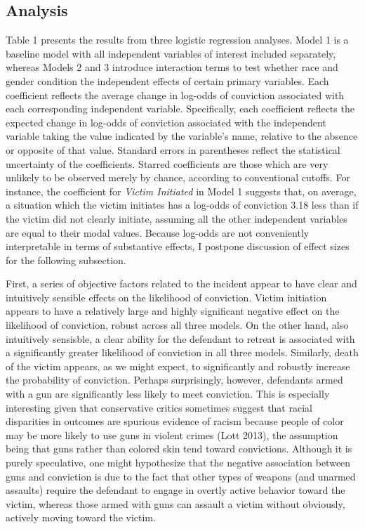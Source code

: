 \documentclass[12pt,article]{article}
\begin{document}
\subsection{Analysis}\label{analysis}

Table 1 presents the results from three logistic regression analyses.
Model 1 is a baseline model with all independent variables of interest
included separately, whereas Models 2 and 3 introduce interaction terms
to test whether race and gender condition the independent effects of
certain primary variables. Each coefficient reflects the average change
in log-odds of conviction associated with each corresponding independent
variable. Specifically, each coefficient reflects the expected change in
log-odds of conviction associated with the independent variable taking
the value indicated by the variable's name, relative to the absence or
opposite of that value. Standard errors in parentheses reflect the
statistical uncertainty of the coefficients. Starred coefficients are
those which are very unlikely to be observed merely by chance, according
to conventional cutoffs. For instance, the coefficient for \emph{Victim
Initiated} in Model 1 suggests that, on average, a situation which the
victim initiates has a log-odds of conviction 3.18 less than if the
victim did not clearly initiate, assuming all the other independent
variables are equal to their modal values. Because log-odds are not
conveniently interpretable in terms of substantive effects, I postpone
discussion of effect sizes for the following subsection.

First, a series of objective factors related to the incident appear to
have clear and intuitively sensible effects on the likelihood of
conviction. Victim initiation appears to have a relatively large and
highly significant negative effect on the likelihood of conviction,
robust across all three models. On the other hand, also intuitively
sensisble, a clear ability for the defendant to retreat is associated
with a significantly greater likelihood of conviction in all three
models. Similarly, death of the victim appears, as we might expect, to
significantly and robustly increase the probability of conviction.
Perhaps surprisingly, however, defendants armed with a gun are
significantly less likely to meet conviction. This is especially
interesting given that conservative critics sometimes suggest that
racial disparities in outcomes are spurious evidence of racism because
people of color may be more likely to use guns in violent crimes (Lott
2013), the assumption being that guns rather than colored skin tend
toward convictions. Although it is purely speculative, one might
hypothesize that the negative association between guns and conviction is
due to the fact that other types of weapons (and unarmed assaults)
require the defendant to engage in overtly active behavior toward the
victim, whereas those armed with guns can assault a victim without
obviously, actively moving toward the victim.
\end{document}
